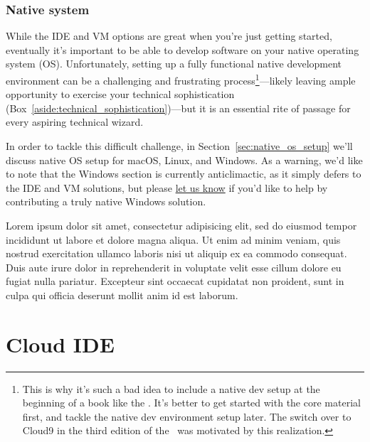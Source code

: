 \subsubsection{Native system} %
\label{sec:native_system}

While the IDE and VM options are great when you're just getting started, eventually it's important to be able to develop software on your native operating system (OS). Unfortunately, setting up a fully functional native development environment can be a challenging and frustrating process\footnote{This is why it's such a bad idea to include a native dev setup at the beginning of a book like the \rort. It's better to get started with the core material first, and tackle the native dev environment setup later. The switch over to Cloud9 in the third edition of the \rort\ was motivated by this realization.}---likely leaving ample opportunity to exercise your technical sophistication (Box~\ref{aside:technical_sophistication})---but it is an essential rite of passage for every aspiring technical wizard.

In order to tackle this difficult challenge, in Section~\ref{sec:native_os_setup} we'll discuss native OS setup for macOS, Linux, and Windows. As a warning, we'd like to note that the Windows section is currently anticlimactic, as it simply defers to the IDE and VM solutions, but please \href{mailto:support@learnenough.com}{let us know} if you'd like to help by contributing a truly native Windows solution.

\begin{aside}
\label{aside:technical_sophistication}

Lorem ipsum dolor sit amet, consectetur adipisicing elit, sed do eiusmod
tempor incididunt ut labore et dolore magna aliqua. Ut enim ad minim veniam,
quis nostrud exercitation ullamco laboris nisi ut aliquip ex ea commodo
consequat. Duis aute irure dolor in reprehenderit in voluptate velit esse
cillum dolore eu fugiat nulla pariatur. Excepteur sint occaecat cupidatat non
proident, sunt in culpa qui officia deserunt mollit anim id est laborum.

\end{aside}



\section{Cloud IDE}
\label{sec:cloud_ide}


